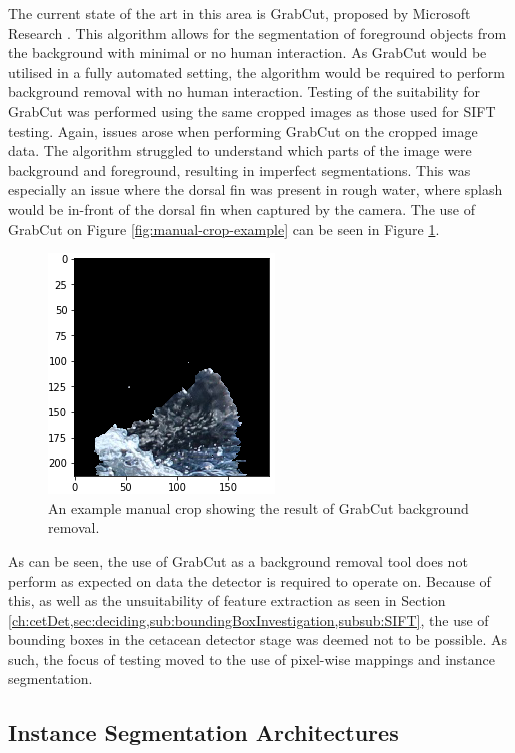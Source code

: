 The current state of the art in this area is GrabCut, proposed by Microsoft Research \cite{rother_grabcut_2004}. This algorithm allows for the segmentation of foreground objects from the background with minimal or no human interaction. As GrabCut would be utilised in a fully automated setting, the algorithm would be required to perform background removal with no human interaction. Testing of the suitability for GrabCut was performed using the same cropped images as those used for SIFT testing. Again, issues arose when performing GrabCut on the cropped image data. The algorithm struggled to understand which parts of the image were background and foreground, resulting in imperfect segmentations. This was especially an issue where the dorsal fin was present in rough water, where splash would be in-front of the dorsal fin when captured by the camera. The use of GrabCut on Figure \ref{fig:manual-crop-example} can be seen in Figure \ref{fig:grabcut-example}.

\begin{figure}
	\begin{center}
		\includegraphics[scale=0.6]{Chapter3/figs/grabcut-example.png}
	\end{center}
	\caption{An example manual crop showing the result of GrabCut background removal.
	}
	\label{fig:grabcut-example}
\end{figure}

As can be seen, the use of GrabCut as a background removal tool does not perform as expected on data the detector is required to operate on. Because of this, as well as the unsuitability of feature extraction as seen in Section \ref{ch:cetDet,sec:deciding,sub:boundingBoxInvestigation,subsub:SIFT}, the use of bounding boxes in the cetacean detector stage was deemed not to be possible. As such, the focus of testing moved to the use of pixel-wise mappings and instance segmentation.  

\subsection{Instance Segmentation Architectures}\label{ch:cetDet,sec:deciding,sub:instanceSegArchitectures}


